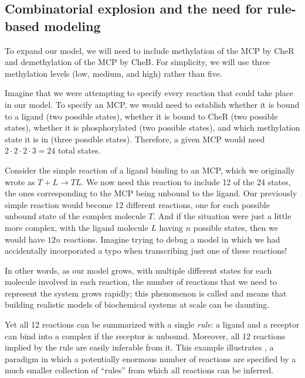 \subsection{Combinatorial explosion and the need for rule-based modeling}

To expand our model, we will need to include methylation of the MCP by CheR and demethylation of the MCP by CheB. For simplicity, we will use three methylation levels (low, medium, and high) rather than five.

Imagine that we were attempting to specify every reaction that could take place in our model. To specify an MCP, we would need to establish whether it is bound to a ligand (two possible states), whether it is bound to CheR (two possible states), whether it is phosphorylated (two possible states), and which methylation state it is in (three possible states). Therefore, a given MCP would need $2 \cdot 2 \cdot 2 \cdot 3 = 24$ total states.

Consider the simple reaction of a ligand binding to an MCP, which we originally wrote as $T + L \rightarrow TL$. We now need this reaction to include 12 of the 24 states, the ones corresponding to the MCP being unbound to the ligand. Our previously simple reaction would become 12 different reactions, one for each possible unbound state of the complex molecule $T$. And if the situation were just a little more complex, with the ligand molecule $L$ having $n$ possible states, then we would have $12n$ reactions. Imagine trying to debug a model in which we had accidentally incorporated a typo when transcribing just one of these reactions!

In other words, as our model grows, with multiple different states for each molecule involved in each reaction, the number of reactions that we need to represent the system grows rapidly; this phenomenon is called  and means that building realistic models of biochemical systems at scale can be daunting.

Yet all 12 reactions can be summarized with a single \textit{rule}: a ligand and a receptor can bind into a complex if the receptor is unbound. Moreover, all 12 reactions implied by the rule are easily inferable from it. This example illustrates , a paradigm in which a potentially enormous number of reactions are specified by a much smaller collection of ``rules'' from which all reactions can be inferred. 

